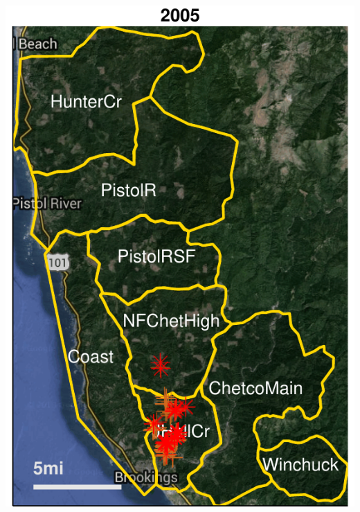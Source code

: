 \documentclass{beamer}\usepackage[]{graphicx}\usepackage[]{color}
\begin{document}
\begin{frame}[allowpagebreak,T]
\begin{columns}[allowpagebreak,T]
\begin{column}{0.5\paperwidth}
			\includegraphics[keepaspectratio,width=0.48\paperwidth]{figure/2005-1.pdf}
		\end{column}
	\end{columns}

\end{frame}
\end{document}

